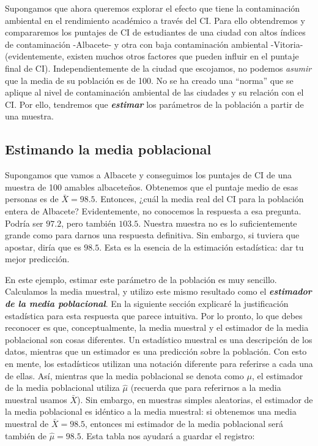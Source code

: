 \documentclass[spanish,]{book}
\begin{document}
Supongamos que ahora queremos explorar el efecto que tiene la
contaminación ambiental en el rendimiento académico a través del CI.
Para ello obtendremos y compararemos los puntajes de CI de estudiantes
de una ciudad con altos índices de contaminación -Albacete- y otra con
baja contaminación ambiental -Vitoria- (evidentemente, existen muchos
otros factores que pueden influir en el puntaje final de CI).
Independientemente de la ciudad que escojamos, no podemos \emph{asumir}
que la media de su población es de 100. No se ha creado una ``norma''
que se aplique al nivel de contaminación ambiental de las ciudades y su
relación con el CI. Por ello, tendremos que \textbf{\emph{estimar}} los
parámetros de la población a partir de una muestra.

\subsection{Estimando la media
poblacional}\label{estimando-la-media-poblacional}

Supongamos que vamos a Albacete y conseguimos los puntajes de CI de una
muestra de 100 amables albaceteños. Obtenemos que el puntaje medio de
esas personas es de \(\bar{X}=98.5\). Entonces, ¿cuál la media real del
CI para la población entera de Albacete? Evidentemente, no conocemos la
respuesta a esa pregunta. Podría ser \(97.2\), pero también \(103.5\).
Nuestra muestra no es lo suficientemente grande como para darnos una
respuesta definitiva. Sin embargo, si tuviera que apostar, diría que es
\(98.5\). Esta es la esencia de la estimación estadística: dar tu mejor
predicción.

En este ejemplo, estimar este parámetro de la población es muy sencillo.
Calculamos la media muestral, y utilizo este mismo resultado como el
\textbf{\emph{estimador de la media poblacional}}. En la siguiente
sección explicaré la justificación estadística para esta respuesta que
parece intuitiva. Por lo pronto, lo que debes reconocer es que,
conceptualmente, la media muestral y el estimador de la media
poblacional son cosas diferentes. Un estadístico muestral es una
descripción de los datos, mientras que un estimador es una predicción
sobre la población. Con esto en mente, los estadísticos utilizan una
notación diferente para referirse a cada una de ellas. Así, mientras que
la media poblacional se denota como \(\mu\), el estimador de la media
poblacional utiliza \(\hat\mu\) (recuerda que para referirnos a la media
muestral usamos \(\bar{X}\)). Sin embargo, en muestras simples
aleatorias, el estimador de la media poblacional es idéntico a la media
muestral: si obtenemos una media muestral de \(\bar{X} = 98.5\),
entonces mi estimador de la media poblacional será también de
\(\hat\mu = 98.5\). Esta tabla nos ayudará a guardar el registro:
\end{document}
